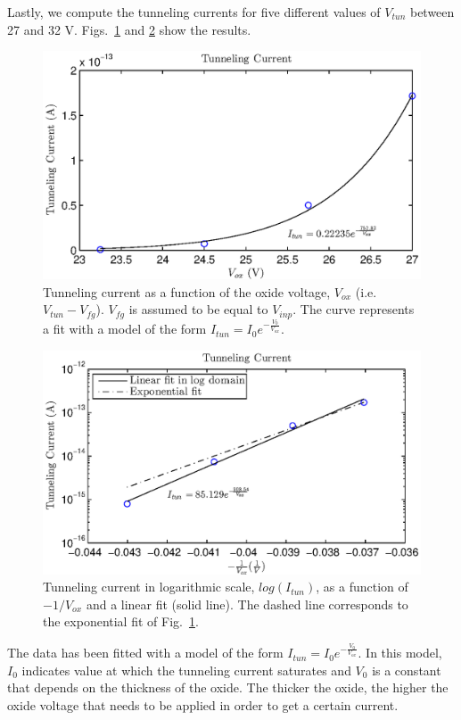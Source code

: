 Lastly, we compute the tunneling currents for five different values of $V_{tun}$ between 27 and 32 V. Figs.~\ref{fig:exp3a} and \ref{fig:exp3b} show the results. 
\begin{figure}[!h]
	\center
	\includegraphics{exp3a.eps}
	\caption{Tunneling current as a function of the oxide voltage, $V_{ox}$ (i.e. $V_{tun}-V_{fg}$). $V_{fg}$ is assumed to be equal to $V_{inp}$. The curve represents a fit with a model of the form $I_{tun}=I_0e^{-\frac{V_0}{V_{ox}}}$.}
	\label{fig:exp3a}
\end{figure}


\begin{figure}[!h]
	\center
	\includegraphics{exp3b.eps}
	\caption{Tunneling current in logarithmic scale, $log(I_{tun})$, as a function of $-1/V_{ox}$ and a linear fit (solid line). The dashed line corresponds to the exponential fit of Fig.~\ref{fig:exp3a}.}
	\label{fig:exp3b}
\end{figure}

The data has been fitted with a model of the form $I_{tun}=I_0e^{-\frac{V_0}{V_{ox}}}$. In this model, $I_0$ indicates value at which the tunneling current saturates and $V_{0}$ is a constant that depends on the thickness of the oxide. The thicker the oxide, the higher the oxide voltage that needs to be applied in order to get a certain current. 

